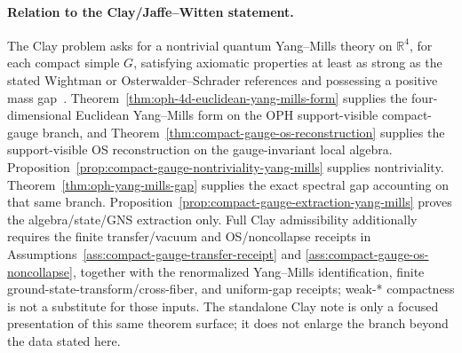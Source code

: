 \paragraph{Relation to the Clay/Jaffe--Witten statement.}
The Clay problem asks for a nontrivial quantum Yang--Mills theory on \(\mathbb R^4\), for each
compact simple \(G\), satisfying axiomatic properties at least as strong as the stated Wightman or
Osterwalder--Schrader references and possessing a positive mass gap~\cite{jaffeWittenYM,clayYM}.
Theorem~\ref{thm:oph-4d-euclidean-yang-mills-form} supplies the four-dimensional Euclidean
Yang--Mills form on the OPH support-visible compact-gauge branch, and
Theorem~\ref{thm:compact-gauge-os-reconstruction} supplies the support-visible OS reconstruction
on the gauge-invariant local algebra. Proposition~\ref{prop:compact-gauge-nontriviality-yang-mills}
supplies nontriviality. 
Theorem~\ref{thm:oph-yang-mills-gap} supplies the exact spectral gap accounting on that same
branch. Proposition~\ref{prop:compact-gauge-extraction-yang-mills} proves the algebra/state/GNS
extraction only. Full Clay admissibility additionally requires the finite transfer/vacuum and
OS/noncollapse receipts in Assumptions~\ref{ass:compact-gauge-transfer-receipt} and
\ref{ass:compact-gauge-os-noncollapse}, together with the renormalized Yang--Mills identification,
finite ground-state-transform/cross-fiber, and uniform-gap receipts; weak-* compactness is not a
substitute for those inputs.
The standalone Clay note is only a focused presentation of this same theorem surface; it does not
enlarge the branch beyond the data stated here.
